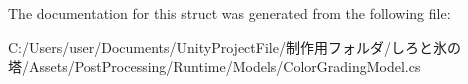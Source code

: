 The documentation for this struct was generated from the following file\+:\begin{DoxyCompactItemize}
\item 
C\+:/\+Users/user/\+Documents/\+Unity\+Project\+File/制作用フォルダ/しろと氷の塔/\+Assets/\+Post\+Processing/\+Runtime/\+Models/Color\+Grading\+Model.\+cs\end{DoxyCompactItemize}
